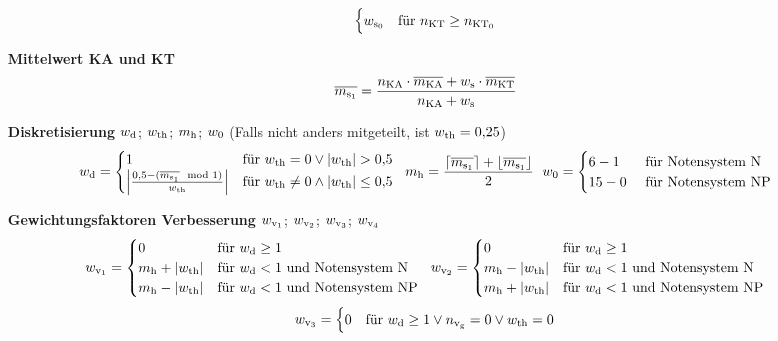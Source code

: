 \begin{enumerate}[label=\textbf{\textbullet}, align=left, leftmargin=*]
\[\begin{cases}
		w_{\mathrm{s}_0} & \text{für }    n_{\mathrm{KT}} \geq n_{\mathrm{KT}_0} \\
	\end{cases}
	\]	
	\item[\textbf{Mittelwert KA und KT}] \vspace{-0.5cm}
	\[
	\overline{m_{\mathrm{s}_1}} = \frac{ n_{\mathrm{KA}} \cdot \overline{m_{\mathrm{KA}}} + w_{\mathrm{s}} \cdot \overline{m_{\mathrm{KT}}} }{n_{\mathrm{KA}} + w_{\mathrm{s}}}
	\]
	\item[\textbf{Diskretisierung}] $w_{\mathrm{d}}$; $w_{\mathrm{th}}$; $m_{\mathrm{h}}$; $w_{0}$ (Falls nicht anders mitgeteilt, ist $w_{\mathrm{th}}=0{,}25$) \cite{wikigaussklammer,wikibetrag,wikimodulo}
	\[
	w_{\mathrm{d}} = 
	\begin{cases}
		1 & \text{für }  w_{\mathrm{th}} = 0 \lor \left | w_{\mathrm{th}} \right | > 0{,}5\\
		\left| \frac{0{,}5 - (\overline{m_{\mathrm{s}_1}} \mod 1)}{w_{\mathrm{th}}} \right| & \text{für } w_{\mathrm{th}} \neq 0 \land  \left | w_{\mathrm{th}} \right | \leq 0{,}5
	\end{cases}
	\,\hspace{0.1cm}\,
	m_{\mathrm{h}} = \frac{\lceil \overline{m_{\mathrm{s}_1}} \rceil + \lfloor \overline{m_{\mathrm{s}_1}} \rfloor}{2}
	\,\hspace{0.1cm}\,
	w_{0} =
	\begin{cases}
		6-1 & \text{ für Notensystem N} \\
		15 - 0 & \text{ für Notensystem NP} \\
	\end{cases}
	\]
	\item[\textbf{Gewichtungsfaktoren Verbesserung}] $w_{\mathrm{v}_1}$; $w_{\mathrm{v}_2}$; $w_{\mathrm{v}_3}$; $w_{\mathrm{v}_4}$ \cite{wikilog}
	\[
	w_{\mathrm{v}_1} =
	\begin{cases}
		0 & \text{für }  w_{\mathrm{d}} \geq 1 \\
		m_{\mathrm{h}} + \left | w_{\mathrm{th}} \right | & \text{für }    w_{\mathrm{d}} < 1 \text{ und Notensystem N} \\
		m_{\mathrm{h}} - \left | w_{\mathrm{th}} \right |& \text{für }    w_{\mathrm{d}} < 1 \text{ und Notensystem NP} \\
	\end{cases}
	\,\,\,\,
	w_{\mathrm{v}_2} =
	\begin{cases}
		0 & \text{für }  w_{\mathrm{d}} \geq 1 \\
		m_{\mathrm{h}} - \left | w_{\mathrm{th}} \right | & \text{für }    w_{\mathrm{d}} < 1 \text{ und Notensystem N} \\
		m_{\mathrm{h}} + \left | w_{\mathrm{th}} \right | & \text{für }    w_{\mathrm{d}} < 1 \text{ und Notensystem NP} \\
	\end{cases}
	\]
	\[
	w_{\mathrm{v}_3} =
	\begin{cases}
		0 & \text{für } w_{\mathrm{d}} \geq 1 \lor n_{\mathrm{v}_\mathrm{g}}=0 \lor w_{\mathrm{th}} = 0\\

\end{cases}\]
\end{enumerate}
